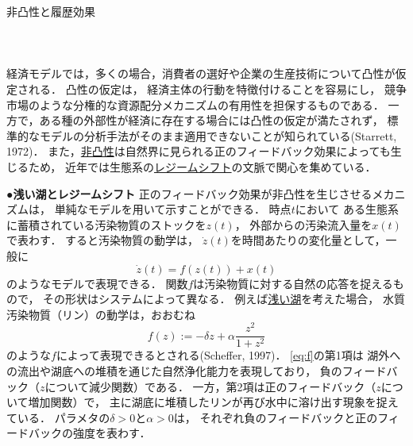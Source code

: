 \documentclass[11pt,a4paper]{article}
\begin{document}
\noindent
非凸性と履歴効果\\
\ \\
\ \\
\ \\

経済モデルでは，多くの場合，消費者の選好や企業の生産技術について凸性が仮定される．
凸性の仮定は，
経済主体の行動を特徴付けることを容易にし，
競争市場のような分権的な資源配分メカニズムの有用性を担保するものである．
一方で，ある種の外部性が経済に存在する場合には凸性の仮定が満たされず，
標準的なモデルの分析手法がそのまま適用できないことが知られている(Starrett, 1972)．
また，\underline{非凸性}は自然界に見られる正のフィードバック効果によっても生じるため，
近年では生態系の\underline{レジームシフト}の文脈で関心を集めている．

\noindent\textbf{●浅い湖とレジームシフト}\hspace{0.5em}
正のフィードバック効果が非凸性を生じさせるメカニズムは，
単純なモデルを用いて示すことができる．
時点$t$において
ある生態系に蓄積されている汚染物質のストックを$z(t)$，
外部からの汚染流入量を$x(t)$で表わす．
すると汚染物質の動学は，
$\dot{z}(t)$を時間あたりの変化量として，一般に
\begin{equation}\label{eq:z}%
  \dot{z}(t) = f(z(t)) + x(t)
\end{equation}
のようなモデルで表現できる．
関数$f$は汚染物質に対する自然の応答を捉えるもので，
その形状はシステムによって異なる．
例えば\underline{浅い湖}を考えた場合，
水質汚染物質（リン）の動学は，おおむね
\begin{equation}\label{eq:f}%
  f(z) := -\delta z + \alpha\frac{z^{2}}{1+z^{2}}
\end{equation}
のような$f$によって表現できるとされる(Scheffer, 1997)．
\eqref{eq:f}の第1項は
湖外への流出や湖底への堆積を通じた自然浄化能力を表現しており，
負のフィードバック（$z$について減少関数）である．
一方，第2項は正のフィードバック（$z$について増加関数）で，
主に湖底に堆積したリンが再び水中に溶け出す現象を捉えている．
パラメタの$\delta >0$と$\alpha >0$は，
それぞれ負のフィードバックと正のフィードバックの強度を表わす．
\end{document}
